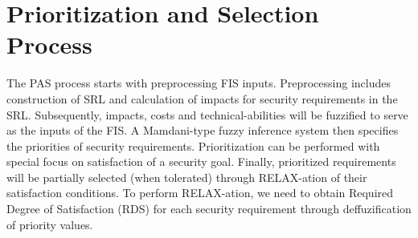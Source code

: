 \section{Prioritization and Selection Process}
\label{pas}

The PAS process starts with preprocessing FIS inputs. Preprocessing includes construction of SRL and calculation of impacts for security requirements in the SRL. Subsequently, impacts, costs and technical-abilities will be fuzzified \cite{bede2013fuzzy} to serve as the inputs of the FIS. A Mamdani-type \cite{mamdani1974application} fuzzy inference system then specifies the priorities of security requirements. Prioritization can be performed with special focus on satisfaction of a security goal. Finally, prioritized requirements will be partially selected (when tolerated) through RELAX-ation of their satisfaction conditions. To perform RELAX-ation, we need to obtain Required Degree of Satisfaction (RDS) for each security requirement through deffuzification of priority values. %


